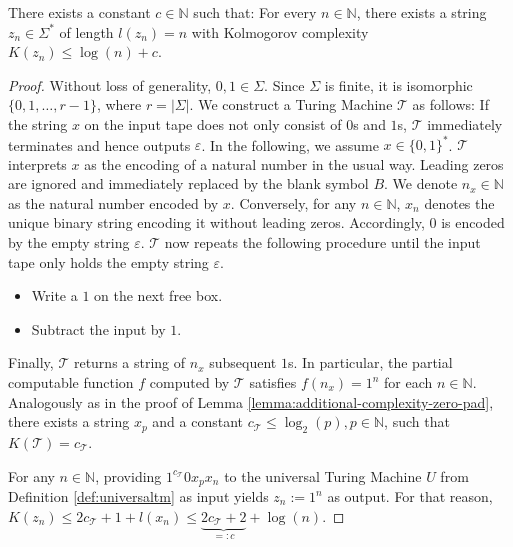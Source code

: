 \begin{lemma}
	\label{lemma:logcompress}
	There exists a constant $c\in\mathbb{N}$ such that:
	For every $n\in\mathbb{N}$, there exists a string $z_n\in\Sigma^{*}$ of length $l(z_n)=n$ with Kolmogorov complexity $K(z_n)\leq \log (n) + c$.
\end{lemma}
\begin{proof}
	Without loss of generality, $0,1\in\Sigma$. Since $\Sigma$ is finite, it is isomorphic $\{0,1,\dots,r-1\}$, where $r=|\Sigma|$.
	We construct a Turing Machine $\mathcal{T}$ as follows:
	If the string $x$ on the input tape does not only consist of $0$s and $1$s, $\mathcal{T}$ immediately terminates and hence outputs $\varepsilon$.
	In the following, we assume $x\in\{0,1\}^{*}$.
	$\mathcal{T}$ interprets $x$ as the encoding of a natural number in the usual way. Leading zeros are ignored and immediately replaced by the blank symbol $B$.
	We denote $n_x\in\mathbb{N}$ as the natural number encoded by $x$. 
	Conversely, for any $n\in\mathbb{N}$, $x_n$ denotes the unique binary string encoding it without leading zeros. Accordingly, $0$ is encoded by the empty string $\varepsilon$.
	$\mathcal{T}$ now repeats the following procedure until the input tape only holds the empty string $\varepsilon$.
	\begin{itemize}
		\item Write a $1$ on the next free box.
		\item Subtract the input by $1$.
	\end{itemize}
	Finally, $\mathcal{T}$ returns a string of $n_x$ subsequent $1$s.
	In particular, the partial computable function $f$ computed by $\mathcal{T}$ satisfies $f(n_x)=1^{n}$ for each $n\in\mathbb{N}$.
	Analogously as in the proof of Lemma \ref{lemma:additional-complexity-zero-pad}, there exists a string $x_p$ and a constant $c_\mathcal{T}\leq\log_2(p),p\in\mathbb{N}$, such that $K(\mathcal{T})=c_\mathcal{T}$. 
	
	For any $n\in\mathbb{N}$, providing $1^{c_\mathcal{T}} 0 x_p x_n$ to the universal Turing Machine $U$ from Definition \ref{def:universaltm} as input yields $z_n:=1^n$ as output.
	For that reason, $K(z_n)\leq 2c_\mathcal{T} + 1 + l(x_n) \leq \underbrace{2c_\mathcal{T}+2}_{=:c}+\log(n)$.
	
\end{proof}

